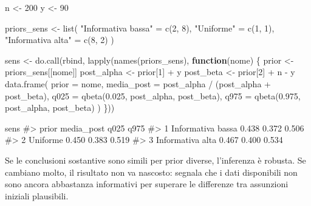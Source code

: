 \documentclass[
  italian,
  letterpaper,
  a4paper,
  11pt,
  open=any]{scrbook}
\newenvironment{Shaded}{\begin{snugshade}}{\end{snugshade}}
\newcommand{\AttributeTok}[1]{\textcolor[rgb]{0.40,0.45,0.13}{#1}}
\newcommand{\CommentTok}[1]{\textcolor[rgb]{0.37,0.37,0.37}{#1}}
\newcommand{\ControlFlowTok}[1]{\textcolor[rgb]{0.00,0.23,0.31}{\textbf{#1}}}
\newcommand{\DecValTok}[1]{\textcolor[rgb]{0.68,0.00,0.00}{#1}}
\newcommand{\FloatTok}[1]{\textcolor[rgb]{0.68,0.00,0.00}{#1}}
\newcommand{\FunctionTok}[1]{\textcolor[rgb]{0.28,0.35,0.67}{#1}}
\newcommand{\NormalTok}[1]{\textcolor[rgb]{0.00,0.23,0.31}{#1}}
\newcommand{\OtherTok}[1]{\textcolor[rgb]{0.00,0.23,0.31}{#1}}
\newcommand{\SpecialCharTok}[1]{\textcolor[rgb]{0.37,0.37,0.37}{#1}}
\newcommand{\StringTok}[1]{\textcolor[rgb]{0.13,0.47,0.30}{#1}}
\theoremstyle{plain}
\theoremstyle{definition}
\theoremstyle{definition}
\theoremstyle{remark}
\begin{document}
\begin{Shaded}
\begin{Highlighting}[]
\NormalTok{n }\OtherTok{\textless{}{-}} \DecValTok{200}
\NormalTok{y }\OtherTok{\textless{}{-}} \DecValTok{90}

\NormalTok{priors\_sens }\OtherTok{\textless{}{-}} \FunctionTok{list}\NormalTok{(}
  \StringTok{"Informativa bassa"} \OtherTok{=} \FunctionTok{c}\NormalTok{(}\DecValTok{2}\NormalTok{, }\DecValTok{8}\NormalTok{),}
  \StringTok{"Uniforme"} \OtherTok{=} \FunctionTok{c}\NormalTok{(}\DecValTok{1}\NormalTok{, }\DecValTok{1}\NormalTok{),}
  \StringTok{"Informativa alta"} \OtherTok{=} \FunctionTok{c}\NormalTok{(}\DecValTok{8}\NormalTok{, }\DecValTok{2}\NormalTok{)}
\NormalTok{)}

\NormalTok{sens }\OtherTok{\textless{}{-}} \FunctionTok{do.call}\NormalTok{(rbind, }\FunctionTok{lapply}\NormalTok{(}\FunctionTok{names}\NormalTok{(priors\_sens), }\ControlFlowTok{function}\NormalTok{(nome) \{}
\NormalTok{  prior }\OtherTok{\textless{}{-}}\NormalTok{ priors\_sens[[nome]]}
\NormalTok{  post\_alpha }\OtherTok{\textless{}{-}}\NormalTok{ prior[}\DecValTok{1}\NormalTok{] }\SpecialCharTok{+}\NormalTok{ y}
\NormalTok{  post\_beta }\OtherTok{\textless{}{-}}\NormalTok{ prior[}\DecValTok{2}\NormalTok{] }\SpecialCharTok{+}\NormalTok{ n }\SpecialCharTok{{-}}\NormalTok{ y}
  \FunctionTok{data.frame}\NormalTok{(}
    \AttributeTok{prior =}\NormalTok{ nome,}
    \AttributeTok{media\_post =}\NormalTok{ post\_alpha }\SpecialCharTok{/}\NormalTok{ (post\_alpha }\SpecialCharTok{+}\NormalTok{ post\_beta),}
    \AttributeTok{q025 =} \FunctionTok{qbeta}\NormalTok{(}\FloatTok{0.025}\NormalTok{, post\_alpha, post\_beta),}
    \AttributeTok{q975 =} \FunctionTok{qbeta}\NormalTok{(}\FloatTok{0.975}\NormalTok{, post\_alpha, post\_beta)}
\NormalTok{  )}
\NormalTok{\}))}

\NormalTok{sens}
\CommentTok{\#\textgreater{}               prior media\_post  q025  q975}
\CommentTok{\#\textgreater{} 1 Informativa bassa      0.438 0.372 0.506}
\CommentTok{\#\textgreater{} 2          Uniforme      0.450 0.383 0.519}
\CommentTok{\#\textgreater{} 3  Informativa alta      0.467 0.400 0.534}
\end{Highlighting}
\end{Shaded}

Se le conclusioni sostantive sono simili per prior diverse, l'inferenza
è robusta. Se cambiano molto, il risultato non va nascosto: segnala che
i dati disponibili non sono ancora abbastanza informativi per superare
le differenze tra assunzioni iniziali plausibili.
\end{document}
